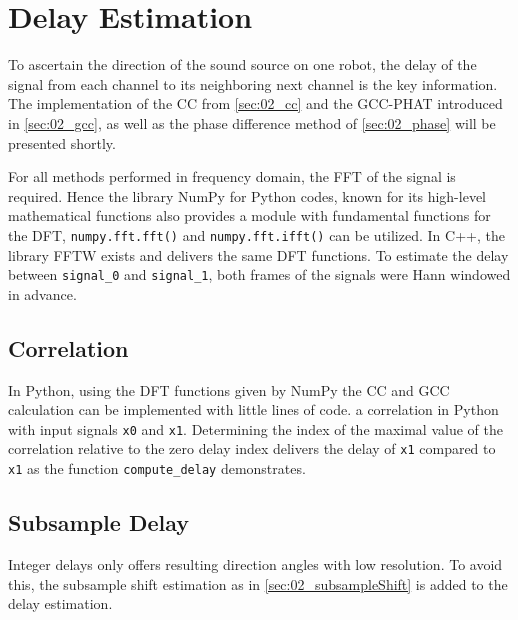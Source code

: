 \section{Delay Estimation}
\label{sec:03_delay}

To ascertain the direction of the sound source on one robot, the
delay of the signal from each channel to its neighboring
next channel is the key information.
The implementation of the \ac{CC} from \cref{sec:02_cc} and the \ac{GCC-PHAT}
introduced in \cref{sec:02_gcc}, as well as the phase difference method
of \cref{sec:02_phase} will be presented shortly.

For all methods performed in frequency domain, the \ac{FFT} of the
signal is required. Hence the library NumPy for Python codes, known for its high-level
mathematical functions also provides a module with fundamental
functions for the \ac{DFT}, \lstinline!numpy.fft.fft()! and
\lstinline!numpy.fft.ifft()! can be utilized.
In C++, the library \ac{FFTW} exists and delivers the same \ac{DFT} functions.
To estimate the delay between \lstinline!signal_0! and \lstinline!signal_1!,
both frames of the signals were Hann windowed in advance.
\subsection*{Correlation}
\label{subsec:03_cc}

In Python, using the \ac{DFT} functions given by NumPy the \ac{CC} and \ac{GCC} calculation
can be implemented with little lines of code.
a correlation in Python with input signals \lstinline!x0! and \lstinline!x1!.
Determining the index of the maximal value of the correlation relative to the zero delay
index delivers the delay of \lstinline!x1! compared to \lstinline!x1! as the function
\lstinline!compute_delay! demonstrates.
\subsection*{Subsample Delay}
\label{subsec:03_subsample}

Integer delays only offers resulting direction angles with low resolution.
To avoid this, the subsample shift estimation as in \cref{sec:02_subsampleShift}
is added to the delay estimation.

